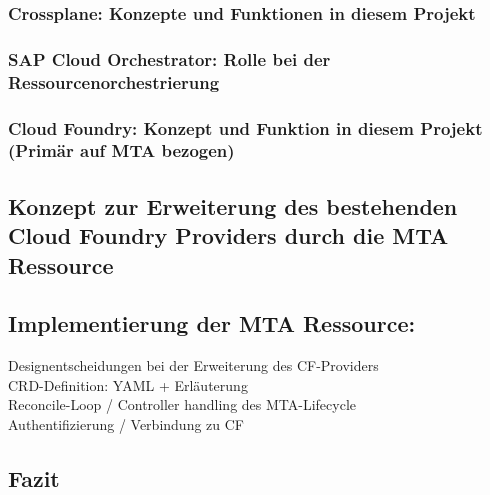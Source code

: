 \subsubsection{Crossplane: Konzepte und Funktionen in diesem Projekt}

\subsubsection{SAP Cloud Orchestrator: Rolle bei der Ressourcenorchestrierung}

\subsubsection{Cloud Foundry: Konzept und Funktion in diesem Projekt (Primär auf MTA bezogen)}

\subsection{Konzept zur Erweiterung des bestehenden Cloud Foundry Providers durch die MTA Ressource}

\subsection{Implementierung der MTA Ressource:}
Designentscheidungen bei der Erweiterung des CF-Providers \\
CRD-Definition: YAML + Erläuterung \\
Reconcile-Loop / Controller handling des MTA-Lifecycle \\
Authentifizierung / Verbindung zu CF

\subsection{Fazit}

